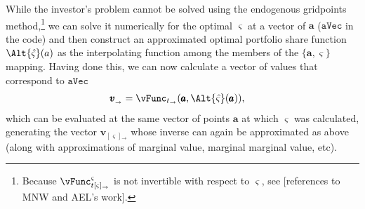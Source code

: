 \documentclass[titlepage, headings=optiontotocandhead]{Resources/texmf-local/tex/latex/econtex}
\begin{document}
While the investor's problem cannot be solved using the endogenous gridpoints method,\footnote{Because $\vFunc^{\varsigma}_{t[\varsigma]_\rightarrow}$ is not invertible with respect to $\varsigma$, see [references to MNW and AEL's work].} we can solve it numerically for the optimal $\varsigma$ at a vector of $\pmb{a}$ ({\ensuremath{\mathtt{aVec}}} in the code)  and then construct an approximated optimal portfolio share function $\Alt{\hat{\varsigma}}(a)$ as the interpolating function among the members of the $\{\pmb{a},\pmb{\varsigma}\}$ mapping.  Having done this, we can now calculate a vector of values that correspond to $\texttt{aVec}$
\begin{equation}\begin{gathered}\begin{aligned}
      \pmb{{v}}_{_\rightarrow}  & = \vFunc_{t_\rightarrow}(\pmb{a},\Alt{\hat{\varsigma}}(\pmb{a})), \label{eq:vShrEnd}
    \end{aligned}\end{gathered}\end{equation}
which can be evaluated at the same vector of points $\pmb{a}$ at which $\pmb{\varsigma}$ was calculated, generating the vector $\pmb{{v}}_{[\varsigma]{_\rightarrow}}$ whose inverse can again be approximated as above (along with approximations of marginal value, marginal marginal value, etc).%
\end{document}
